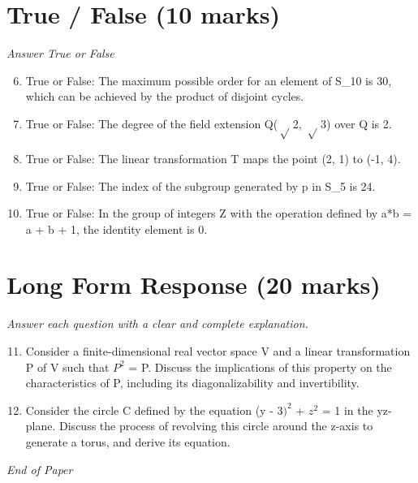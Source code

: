 \documentclass[12pt]{article}
\begin{document}
\section*{True / False (10 marks)}
\textit{Answer True or False}
\begin{enumerate}[label=\arabic*.]
\setcounter{enumi}{5}
\item True or False: The maximum possible order for an element of S\_10 is 30, which can be achieved by the product of disjoint cycles.
\item True or False: The degree of the field extension Q(\ensuremath{\sqrt} 2, \ensuremath{\sqrt} 3) over Q is 2.
\item True or False: The linear transformation T maps the point (2, 1) to (-1, 4).
\item True or False: The index of the subgroup generated by p in S\_5 is 24.
\item True or False: In the group of integers Z with the operation defined by a*b = a + b + 1, the identity element is 0.
\end{enumerate}

\section*{Long Form Response (20 marks)}
\textit{Answer each question with a clear and complete explanation.}
\begin{enumerate}[label=\arabic*.]
\setcounter{enumi}{10}
\item Consider a finite-dimensional real vector space V and a linear transformation P of V such that $P^2$ = P. Discuss the implications of this property on the characteristics of P, including its diagonalizability and invertibility.
\item Consider the circle C defined by the equation (y - $3)^2$ + $z^2$ = 1 in the yz-plane. Discuss the process of revolving this circle around the z-axis to generate a torus, and derive its equation.
\end{enumerate}

\vfill
\noindent\textit{End of Paper}
\end{document}
